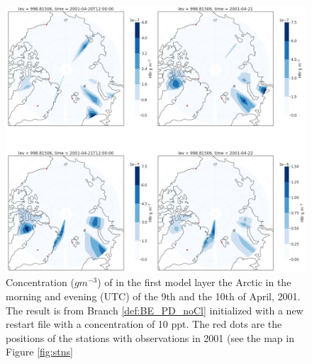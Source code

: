 \begin{figure}[ht]
    \centering
    \includegraphics[width=\linewidth]{Chapter6_Results/images/polarHBr_newRestart.png}
    \caption{Concentration ($g m^{-3}$) of  in the first model layer the Arctic in the morning and evening (UTC) of the 9th and the 10th of April, 2001. The result is from Branch \ref{def:BE_PD_noCl} initialized with a new restart file with a  concentration of 10 ppt. The red dots are the positions of the stations with observations in 2001 (see the map in Figure \ref{fig:stns}}
    \label{fig:polarHBr_newRestart}
\end{figure}